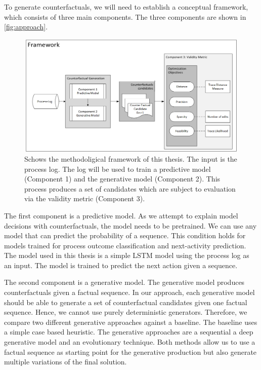 \documentclass[./../../paper.tex]{subfiles}
\begin{document}
To generate counterfactuals, we will need to establish a conceptual framework, which consists of three main components. The three components are shown in \autoref{fig:approach}. 

\begin{figure}[htb]
    \centering
    \includegraphics[width=0.99\textwidth]{figures/framework.png}
    \caption{Schows the methodoligical framework of this thesis. The input is the process log. The log will be used to train a predictive model (Component 1) and the generative model (Component 2). This process produces a set of candidates which are subject to evaluation via the validity metric (Component 3).}
    \label{fig:approach}
\end{figure}

The first component is a predictive model. As we attempt to explain model decisions with counterfactuals, the model needs to be pretrained. We can use any model that can predict the probability of a sequence. This condition holds for models trained for process outcome classification and next-activity prediction. The model used in this thesis is a simple LSTM model using the process log as an input. The model is trained to predict the next action given a sequence. 

The second component is a generative model. The generative model produces counterfactuals given a factual sequence. In our approach, each generative model should be able to generate a set of counterfactual candidates given one factual sequence. Hence, we cannot use purely deterministic generators. Therefore, we compare two different generative approaches against a baseline. The baseline uses a simple case based heuristic. The  generative approaches are a sequential a deep generative model and an evolutionary technique. Both methods allow us to use a factual sequence as starting point for the generative production but also generate multiple variations of the final solution. 
\end{document}
